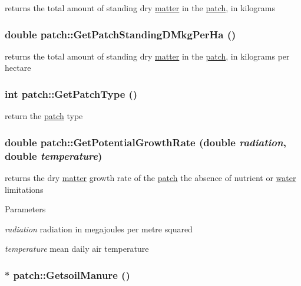 returns the total amount of standing dry \hyperlink{classmatter}{matter} in the \hyperlink{classpatch}{patch}, in kilograms \hypertarget{classpatch_a7acb474f81652d0f068fec53e4f39820}{
\subsubsection[{GetPatchStandingDMkgPerHa}]{\setlength{\rightskip}{0pt plus 5cm}double patch::GetPatchStandingDMkgPerHa ()}}
\label{classpatch_a7acb474f81652d0f068fec53e4f39820}


returns the total amount of standing dry \hyperlink{classmatter}{matter} in the \hyperlink{classpatch}{patch}, in kilograms per hectare \hypertarget{classpatch_a6bafafe564eadfc87a06315e01402444}{
\subsubsection[{GetPatchType}]{\setlength{\rightskip}{0pt plus 5cm}int patch::GetPatchType ()}}
\label{classpatch_a6bafafe564eadfc87a06315e01402444}


return the \hyperlink{classpatch}{patch} type \hypertarget{classpatch_a1084593c1a741685fc7277569df31516}{
\subsubsection[{GetPotentialGrowthRate}]{\setlength{\rightskip}{0pt plus 5cm}double patch::GetPotentialGrowthRate (double {\em radiation}, \/  double {\em temperature})}}
\label{classpatch_a1084593c1a741685fc7277569df31516}


returns the dry \hyperlink{classmatter}{matter} growth rate of the \hyperlink{classpatch}{patch} the absence of nutrient or \hyperlink{classwater}{water} limitations 
\begin{DoxyParams}{Parameters}
\item[{\em radiation}]radiation in megajoules per metre squared \item[{\em temperature}]mean daily air temperature \end{DoxyParams}
\hypertarget{classpatch_a068ad8fb3dcd42c165c25fef304df220}{
\subsubsection[{GetsoilManure}]{$\ast$ patch::GetsoilManure ()}}
\label{classpatch_a068ad8fb3dcd42c165c25fef304df220}


